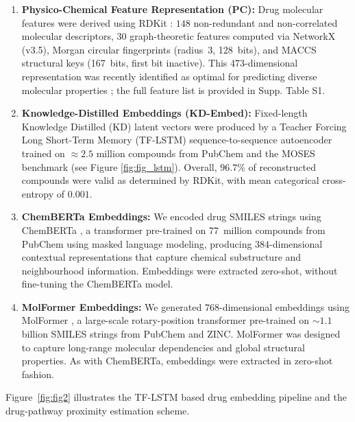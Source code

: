 \documentclass[pdflatex,sn-mathphys-num]{sn-jnl}
\theoremstyle{thmstyleone}
\theoremstyle{thmstyletwo}
\theoremstyle{thmstylethree}
\begin{document}
\begin{enumerate}
    \item \textbf{Physico-Chemical Feature Representation (PC):} Drug molecular features were derived using RDKit \cite{bento2020open}: $148$ non-redundant and non-correlated molecular descriptors, $30$ graph-theoretic features computed via NetworkX (v3.5), Morgan circular fingerprints (radius~3, 128~bits), and MACCS structural keys (167~bits, first bit inactive). This 473-dimensional representation was recently identified as optimal for predicting diverse molecular properties \cite{harod2025effichem}; the full feature list is provided in Supp. Table S1.

    \item \textbf{Knowledge-Distilled Embeddings (KD-Embed):} Fixed-length Knowledge Distilled (KD) latent vectors were produced by a Teacher Forcing Long Short-Term Memory (TF-LSTM) sequence-to-sequence autoencoder \cite{mall2021modeling} trained on $\approx\!2.5$ million compounds from PubChem \cite{kim2025pubchem} and the MOSES benchmark \cite{10.3389/fphar.2020.565644} (see Figure \ref{fig:fig_lstm}). Overall, $96.7\%$ of reconstructed compounds were valid as determined by RDKit, with mean categorical cross-entropy of $0.001$.
    
    \item \textbf{ChemBERTa Embeddings:} We encoded drug SMILES strings using ChemBERTa \cite{chithrananda2020chemberta}, a transformer pre-trained on 77~million compounds from PubChem using masked language modeling, producing $384$-dimensional contextual representations that capture chemical substructure and neighbourhood information. Embeddings were extracted zero-shot, without fine-tuning the ChemBERTa model.
    \item \textbf{MolFormer Embeddings:} We generated $768$-dimensional embeddings using MolFormer \cite{ross2022large}, a large-scale rotary-position transformer pre-trained on $\sim\!1.1$ billion SMILES strings from PubChem and ZINC. MolFormer was designed to capture long-range molecular dependencies and global structural properties. As with ChemBERTa, embeddings were extracted in zero-shot fashion.
\end{enumerate}

Figure~\ref{fig:fig2} illustrates the TF-LSTM based drug embedding pipeline and the drug-pathway proximity estimation scheme.
\end{document}
